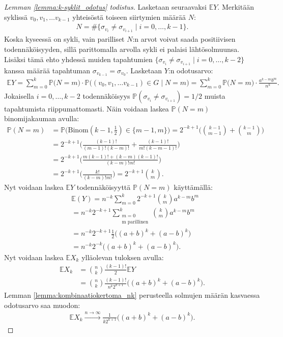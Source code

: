 \documentclass[finnish,12pt,a4paper,pdftex,sci,utf8]{aaltothesis}
\begin{document}
\begin{proof}[Lemman \ref{lemma:k-syklit_odotus} todistus]
	Lasketaan seuraavaksi $\mathbb{E} Y$. Merkitään syklissä $v_0, v_1, \ldots v_{k-1}$ yhteisöstä toiseen siirtymien määrää $N$:
	\begin{align*}
		N = \#\{\sigma_{v_i} \neq \sigma_{v_{i+1}} \mid i = 0, \ldots, k-1 \}. 
	\end{align*}
	Koska kyseessä on sykli, vain parilliset $N$:n arvot voivat saada positiivisen todennäköisyyden, sillä parittomalla arvolla sykli ei palaisi lähtösolmuunsa. Lisäksi tämä ehto yhdessä muiden tapahtumien $\{\sigma_{v_i} \neq \sigma_{v_{i+1}} \mid i = 0, \ldots, k-2\}$ kanssa määrää tapahtuman $\sigma_{v_{k-1}} = \sigma_{v_0}$. 
	Lasketaan $Y$:n odotusarvo:
	\begin{align*}
		\mathbb{E}Y = \sum^{k}_{m=0}\mathbb{P}\big(N=m\big) \cdot \mathbb{P}\big((v_0, v_1, \ldots v_{k-1}) \in G \mid N=m\big)
		= \sum^{k}_{m=0}\mathbb{P}\big(N=m\big) \cdot  \frac{a^{k-m}b^{m}}{n^{k}}.
	\end{align*}
	Jokaisella $i = 0, \ldots , k-2$ todennäköisyys $\mathbb{P}(\sigma_{v_i} \neq \sigma_{v_{i+1}}) = 1/2$ muista tapahtumista riippumattomasti. Näin voidaan laskea $\mathbb{P}(N = m)$ binomijakauman avulla: 
	\begin{align*}
		\mathbb{P}(N = m) &= \mathbb{P}\big(\text{Binom}(k-1, \frac{1}{2}) \in \{m-1, m\}\big)
		= 2^{-k+1}\Bigg(\binom{k-1}{m-1} + \binom{k-1}{m}\Bigg) \\
		&= 2^{-k+1}\Bigg(\frac{(k-1)!}{(m-1)!(k-m)!} + \frac{(k-1)!}{m!(k-m-1)!}\Bigg) \\
		&= 2^{-k+1}\Bigg(\frac{m(k-1)! + (k-m)(k-1)!}{(k-m)!m!}\Bigg) \\
		&= 2^{-k+1}\Bigg(\frac{k!}{(k-m)!m!}\Bigg) = 2^{-k+1}\binom{k}{m}.
	\end{align*}
	Nyt voidaan laskea $\mathbb{E} Y$ todennäköisyyttä $\mathbb{P}(N = m)$ käyttämällä:
	\begin{align*}
		&\mathbb{E}(Y) = n^{-k} \sum^{k}_{m=0} 2^{-k+1}\binom{k}{m} a^{k-m}b^{m} \\
		&= n^{-k} 2^{-k+1} \sum_{\substack{m=0 \\ \text{m parillinen}}}^k \binom{k}{m}a^{k-m}b^{m} \\
		&= n^{-k} 2^{-k+1} \frac{1}{2} \big((a+b)^k + (a-b)^k \big) \\
		&= n^{-k} 2^{-k} \big((a+b)^k + (a-b)^k \big).
	\end{align*}
	Nyt voidaan laskea $\mathbb{E}X_k$ ylläolevan tuloksen avulla:
	\begin{align*}
		\mathbb{E}X_k &= \binom{n}{k}\frac{(k-1)!}{2} \mathbb{E}Y \\
		&= \binom{n}{k}\frac{(k-1)!}{n^{k} 2^{k+1}} \big((a+b)^k + (a-b)^k \big).
	\end{align*}
 	Lemman \ref{lemma:kombinaatiokertoma_nk} perusteella solmujen määrän kasvaessa odotusarvo saa muodon:
	\begin{align*}
		\mathbb{E}X_k \xrightarrow{n \rightarrow \infty} \frac{1}{k2^{k+1}} \big((a+b)^k + (a-b)^k \big).
	\end{align*}
\end{proof}
\end{document}
